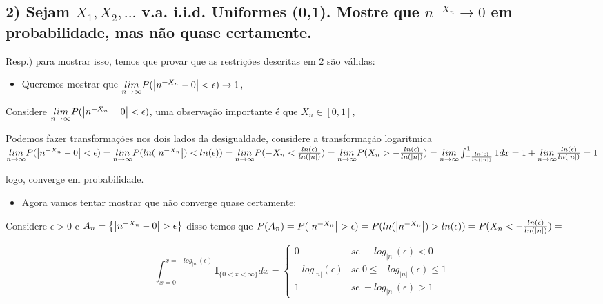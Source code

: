 \documentclass[portuguese]{article}
\begin{document}
\subsection*{\textcompwordmark{}}


\subsection*{\textmd{2) Sejam $X_{1},X_{2},...$ v.a. i.i.d. Uniformes (0,1).
Mostre que $n^{-X_{n}}\rightarrow0$ em probabilidade, mas não quase
certamente.}}

Resp.) para mostrar isso, temos que provar que as restrições descritas
em 2 são válidas:
\begin{itemize}
\item Queremos mostrar que $\underset{n\rightarrow\infty}{lim}P(\left|n^{\text{\textminus}X_{n}}-0\right|<\epsilon)\rightarrow1$,
\end{itemize}
Considere $\underset{n\rightarrow\infty}{lim}P(\left|n^{\text{\textminus}X_{n}}-0\right|<\epsilon)$,
uma observação importante é que $X_{n}\in[0,1]$, 

Podemos fazer transformações nos dois lados da desigualdade, considere
a transformação logaritmica $\underset{n\rightarrow\infty}{lim}P(\left|n^{\text{\textminus}X_{n}}-0\right|<\epsilon)=\underset{n\rightarrow\infty}{lim}P(ln(\left|n^{\text{\textminus}X_{n}}\right|)<ln(\epsilon))=\underset{n\rightarrow\infty}{lim}P(-X_{n}<\frac{ln(\epsilon)}{ln(\left|n\right|)})=\underset{n\rightarrow\infty}{lim}P(X_{n}>-\frac{ln(\epsilon)}{ln(\left|n\right|)})=\underset{n\rightarrow\infty}{lim}\int_{-\frac{ln(\epsilon)}{ln(\left|n\right|)}}^{1}1dx=1+\underset{n\rightarrow\infty}{lim}\frac{ln(\epsilon)}{ln(\left|n\right|)}=1$

logo, converge em probabilidade.
\begin{itemize}
\item Agora vamos tentar mostrar que não converge quase certamente:
\end{itemize}
Considere $\epsilon>0$ e $A_{n}=\left\{ \left|n^{\text{\textminus}X_{n}}-0\right|>\epsilon\right\} $
disso temos que $P(A_{n})=P(\left|n^{\text{\textminus}X_{n}}\right|>\epsilon)=P(ln(\left|n^{\text{\textminus}X_{n}}\right|)>ln(\epsilon))=P(X_{n}<-\frac{ln(\epsilon)}{ln(\left|n\right|)})=$

\[
\int_{x=0}^{x=-log_{\left|n\right|}(\epsilon)}\mathbf{I}_{\{0<x<\infty\}}dx=\begin{cases}
0 & se\ -log_{\left|n\right|}(\epsilon)<0\\
-log_{\left|n\right|}(\epsilon) & se\ 0\le-log_{\left|n\right|}(\epsilon)\le1\\
1 & se\ -log_{\left|n\right|}(\epsilon)>1
\end{cases}
\]
\end{document}
